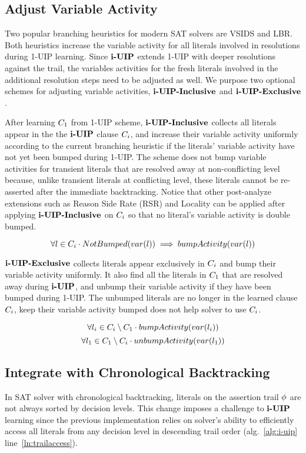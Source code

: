 \subsection{Adjust Variable Activity} \label{sec: varajust}
Two popular branching heuristics for modern SAT solvers are VSIDS and LBR. Both heuristics increase 
the variable activity for all literals involved in resolutions during 1-UIP learning. Since $\textbf{i-UIP}$ extends 1-UIP with deeper resolutions against the trail, the variables activities for the fresh literals involved in the additional resolution steps need to be adjusted as well. We purpose two optional schemes for adjusting variable activities, $\textbf{i-UIP-Inclusive}$ and $\textbf{i-UIP-Exclusive}$. 

After learning $C_{1}$ from 1-UIP scheme, $\textbf{i-UIP-Inclusive}$ collects all literals appear  in the the $\textbf{i-UIP}$ clause $C_{i}$, and increase their variable activity uniformly according to the current branching heuristic if the literals' variable activity have not yet been bumped during 1-UIP. The scheme does not bump variable activities for transient literals that are resolved away at non-conflicting level because, unlike transient literals at conflicting level, these literals cannot be re-asserted after the immediate backtracking. Notice that other post-analyze extensions such as Reason Side Rate (RSR) and Locality\cite{} can be applied after applying $\textbf{i-UIP-Inclusive}$ on $C_{i}$ so that no literal's variable activity is double bumped.

\[ \forall l \in  C_{i} \cdot NotBumped(var(l)) \implies  bumpActivity(var(l)) \]

$\textbf{i-UIP-Exclusive}$ collects literals appear exclusively in $C_{i}$ and bump their variable activity uniformly. It also find all the literals in $C_{1}$ that are resolved away during $\textbf{i-UIP}$, and unbump their variable activity if they have been bumped during 1-UIP. The unbumped literals are no longer in the learned clause $C_{i}$, keep their variable activity bumped does not help solver to use $C_{i}$.

\[ \forall l_{i} \in  C_{i} \setminus C_{1} \cdot bumpActivity(var(l_{i})) 
\]
\[ \forall l_{1} \in  C_{1} \setminus C_{i} \cdot unbumpActivity(var(l_{1})) 
\]


\subsection{Integrate with Chronological Backtracking}
In SAT solver with chronological backtracking, literals on the assertion trail $\phi$ are not always sorted by decision levels. This change imposes a challenge to $\textbf{i-UIP}$ learning since the previous implementation relies on solver's ability to efficiently access all literals from any decision level in descending trail order (alg.~\ref{alg:i-uip} line~\ref{ln:trailaccess}). 

